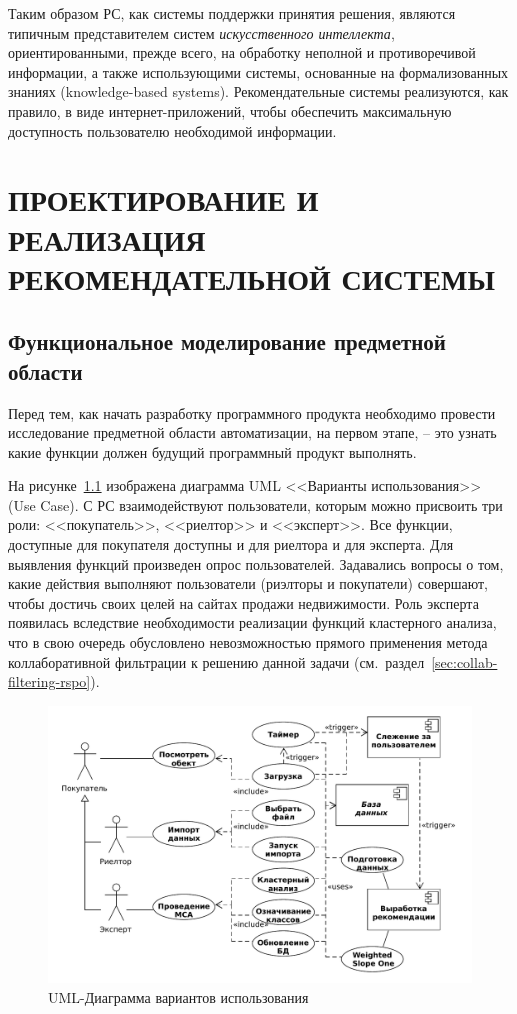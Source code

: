 \documentclass[a4paper,14pt,openany,final]{extreport} %
\def\oldcaption{} \let\oldcaption=\caption
\def\caption{\stepcounter{captionsnum}\oldcaption}
\begin{document}
Таким образом РС, как системы поддержки принятия решения, являются типичным представителем систем \emph{искусственного интеллекта}, ориентированными, прежде всего, на обработку неполной и противоречивой информации, а также использующими системы, основанные на формализованных знаниях (\foreignlanguage{english}{knowledge-based systems}). Рекомендательные системы реализуются, как правило, в виде интернет-приложений, чтобы обеспечить максимальную доступность пользователю необходимой информации.

\chapter{ПРОЕКТИРОВАНИЕ И РЕАЛИЗАЦИЯ РЕКОМЕНДАТЕЛЬНОЙ СИСТЕМЫ}
\label{chap:dev-tech-theory}
\section{Функциональное моделирование предметной области}

Перед тем, как начать разработку программного продукта необходимо провести исследование предметной области автоматизации, на первом этапе, -- это узнать какие функции должен будущий программный продукт выполнять.

На рисунке~\ref{fig:umlusecase} изображена диаграмма UML <<Варианты использования>> (Use Case).  С РС взаимодействуют пользователи, которым можно присвоить три роли: <<покупатель>>, <<риелтор>> и <<эксперт>>. Все функции, доступные для покупателя доступны и для риелтора и для эксперта. Для выявления функций произведен опрос пользователей.  Задавались вопросы о том, какие действия выполняют пользователи (риэлторы и покупатели) совершают, чтобы достичь своих целей на сайтах продажи недвижимости. Роль эксперта появилась вследствие необходимости реализации функций кластерного анализа, что в свою очередь обусловлено невозможностью прямого применения метода коллаборативной фильтрации к решению данной задачи (см.~раздел~\ref{sec:collab-filtering-rspo}).

\begin{figure}[htbp]
  \centering
  \includegraphics[width=0.9\linewidth]{use_case.pdf}
  \caption{UML-Диаграмма вариантов использования}
  \label{fig:umlusecase}
\end{figure}
\end{document}
